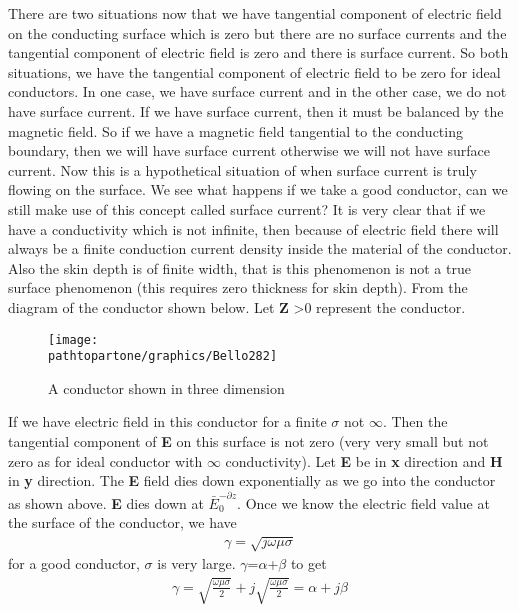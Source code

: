 There are two situations now that we have tangential component of electric field on the conducting surface which is zero but there are no surface currents and the tangential component of electric field is zero and there is surface current. So both situations, we have the tangential component of electric field to be zero for ideal conductors. In one case, we have surface current and in the other case, we do not have surface current. If we have surface current, then it must be balanced by the magnetic field. So if we have a magnetic field tangential to the conducting boundary, then we will have surface current otherwise we will not have surface current. Now this is a hypothetical situation of when surface current is truly flowing on the surface. We see what happens if we take a good conductor, can we still make use of this concept called surface current? It is very clear that if we have a conductivity which is not infinite, then because of electric field there will always be a finite conduction current density inside the material of the conductor. Also the skin depth is of finite width, that is this phenomenon is not a true surface phenomenon (this requires zero thickness for skin depth). From the diagram of the conductor shown below. Let \textbf{Z} \textgreater 0 represent the conductor.
\begin{figure}[h]
\centering
\texttt{[image: \\pathtopartone/graphics/Bello282]}
\caption{A conductor shown in three dimension}
\end{figure}	

If we have electric field in this conductor for a finite $\sigma$ not $\infty$. Then the tangential component of \textbf{E} on this surface is not zero (very very small but not zero as for ideal conductor with $\infty$ conductivity). Let \textbf{E} be in \textbf{x} direction and \textbf{H} in \textbf{y} direction. The \textbf{E} field dies down exponentially as we go into the conductor as shown above. \textbf{E} dies down at $\bar{E}_0^{-\partial z}$. Once we know the electric field value at the surface of the conductor, we have
\begin{align}
\gamma=\sqrt{\textit{j}\omega\mu\sigma}
\end{align}
for a good conductor, $\sigma$ is very large. $\gamma$=$\alpha$+$\beta$ to get
\begin{align}
\gamma=\sqrt{\frac{\omega\mu\sigma}{2}}+\textit{j}\sqrt{\frac{\omega\mu\sigma}{2}}=\alpha+\textit{j}\beta
\end{align}

